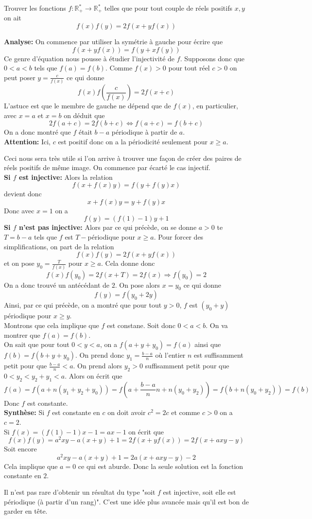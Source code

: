 \begin{exo}[D]
Trouver les fonctions $f:\mathbb{R}_+^*\to \mathbb{R}_+^*$ telles que pour tout couple de réels positifs $x,y$ on ait 
$$f(x)f(y) = 2f(x+yf(x)) $$
\end{exo}
\begin{preuve}
\textbf{Analyse:} On commence par utiliser la symétrie à gauche pour écrire que 
$$f(x+yf(x))=f(y+xf(y)) $$
Ce genre d'équation nous pousse à étudier l'injectivité de $f$. Supposons donc que 
$0<a<b$ tels que $f(a)=f(b)$. Comme $f(x)>0$ pour tout réel $c>0$ on peut poser $y=\frac{c}{f(x)}$ ce qui donne 
$$f(x)f\left(\frac{c}{f(x)}\right)=2f(x+c) $$
L'astuce est que le membre de gauche ne dépend que de $f(x)$, en particulier, avec $x=a$ et $x=b$ on déduit que 
$$2f(a+c)=2f(b+c)\iff f(a+c)=f(b+c)$$
On a donc montré que $f$ était $b-a$ périodique à partir de $a$. 
\\
\textbf{Attention:} Ici, $c$ est positif donc on a la périodicité seulement pour $x\geq a$.

Ceci nous sera très utile si l'on arrive à trouver une façon de créer des paires de réels positifs de même image. On commence par écarté le cas injectif.
\\
\textbf{Si $f$ est injective:}
Alors la relation $$f(x+f(x)y)=f(y+f(y)x) $$ devient donc 
$$x+f(x)y=y+f(y)x $$
Donc avec $x=1$ on a 
$$f(y)=(f(1)-1)y+1 $$
\textbf{Si $f$ n'est pas injective:}
Alors par ce qui précède, on se donne $a>0$ te $T=b-a$ tels que $f$ est $T-$périodique pour $x\geq a$. Pour forcer des simplifications, on part de la relation 
$$f(x)f(y)=2f(x+yf(x)) $$ et on pose $y_0=\frac{T}{f(x)}$ pour $x\geq a$. Cela donne donc
$$f(x)f(y_0)=2f(x+T)=2f(x)\Rightarrow f(y_0)=2 $$
On a donc trouvé un antécédant de $2$. On pose alors $x=y_0$ ce qui donne 
$$f(y)=f(y_0+2y) $$
Ainsi, par ce qui précède, on a montré que pour tout $y>0$, $f$ est $(y_0+y)$ périodique pour $x\geq y$.
\\
Montrons que cela implique que $f$ est constane. Soit donc $0<a<b$. On va montrer que $f(a)=f(b)$.
\\
On sait que pour tout $0<y<a$, on a 
$f(a+y+y_0)=f(a)$ ainsi que $f(b)=f(b+y+y_0)$.
On prend donc $y_1=\frac{b-a}{n}$ où l'entier $n$ est suffisamment petit pour que $\frac{b-a}{n}<a$. On prend alors $y_2>0$ suffisamment petit pour que $0<y_2<y_2+y_1<a$. Alors on écrit que 
$$f(a)=f(a+n(y_1+y_2+y_0))=f\left(a+\frac{b-a}{n}n+n(y_0+y_2)\right)=f(b+n(y_0+y_2))=f(b) $$
Donc $f$ est constante.
\\
\textbf{Synthèse:} Si $f$ est constante en $c$ on doit avoir $c^2=2c$ et comme $c>0$ on a $c=2$.
\\
Si $f(x)=(f(1)-1)x-1=ax-1$ on écrit que 
$$f(x)f(y)=a^2xy-a(x+y)+1=2f(x+yf(x))=2f(x+axy-y) $$
Soit encore
$$a^2xy-a(x+y)+1=2a(x+axy-y)-2 $$
Cela implique que $a=0$ ce qui est aburde. Donc la seule solution est la fonction constante en $2$.

\end{preuve}
\begin{rem}
Il n'est pas rare d'obtenir un résultat du type "soit $f$ est injective, soit elle est périodique (à partir d'un rang)". C'est une idée plus avancée mais qu'il est bon de garder en tête.
\end{rem}













